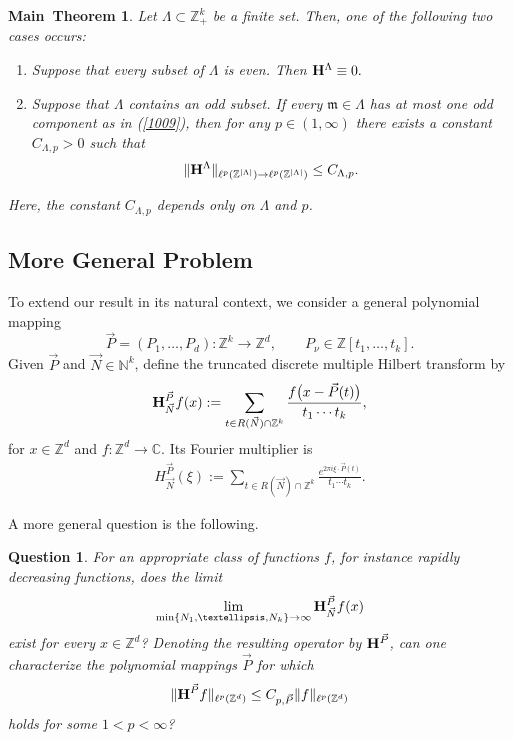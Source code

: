 \documentclass[10pt,a4paper]{amsart}
\newtheorem{main}{Main~Theorem}{}
\newtheorem{question}{Question}\numberwithin{question}{section}
\numberwithin{equation}{section}
\begin{document}
\begin{main}\label{mt2} 
Let $\Lambda \subset \mathbb{Z}_+^k$ be a finite set. Then, one of the following two cases occurs:
\begin{enumerate}
	\item[(i)] Suppose that every subset of $\Lambda$ is even. Then
	${\bf H}^{\Lambda} \equiv 0.$
	
	
	\item[(ii)] Suppose that $\Lambda$ contains an odd subset. 
	If every $\mathfrak{m} \in \Lambda$ has at most one odd component as in (\ref{1009}), then for any
	$p \in (1,\infty)$ there exists a constant $C_{\Lambda,p} > 0$ such that
	\[
	\| {\bf H}^{\Lambda} \|_{\ell^p(\mathbb{Z}^{|\Lambda|}) \to \ell^p(\mathbb{Z}^{|\Lambda|})}
	\le C_{\Lambda,p}.
	\]
\end{enumerate}
Here, the constant $C_{\Lambda,p}$ depends only on $\Lambda$ and $p$.
\end{main}






\subsection{More General Problem}
To extend our result in its natural context, we  consider a general polynomial mapping
\[
\vec P=(P_1,\ldots,P_d):\mathbb Z^k\to\mathbb Z^d,
\qquad
P_\nu\in\mathbb Z[t_1,\ldots,t_k].
\]
Given $\vec P$ and $\vec N\in\mathbb N^k$, define the truncated discrete
multiple Hilbert transform by
\begin{align}\label{mtp2}
	{\bf H}^{\vec P}_{\vec N}f(x)
	:=
	\sum_{t\in R(\vec N)\cap\mathbb Z^k}
	\frac{f\bigl(x-\vec P(t)\bigr)}{t_1\cdots t_k},
\end{align}for $x\in\mathbb Z^d$ and $f:\mathbb Z^d\to\mathbb C.$
Its Fourier multiplier is
\begin{align*}
	H^{\vec P}_{\vec N}(\xi)
	:=
	\sum_{t\in R(\vec N)\cap\mathbb Z^k}
	\frac{e^{2\pi i\xi\cdot\vec P(t)}}{t_1\cdots t_k}.
\end{align*}

A more general question is the following.

\medskip
\noindent
\begin{question}\label{q11}
	For an appropriate class of functions $f$, for instance rapidly decreasing
	functions, does the limit
	\[
	\lim_{\min\{N_1,\ldots,N_k\}\to\infty}
	{\bf H}^{\vec P}_{\vec N}f(x)
	\]
	exist for every $x\in\mathbb Z^d$? Denoting the resulting operator by
	${\bf H}^{\vec P}$, can one characterize the polynomial mappings $\vec P$
	for which
	\begin{align*}
		\|{\bf H}^{\vec P}f\|_{\ell^p(\mathbb Z^d)}
		\le
		C_{p,\vec P}\|f\|_{\ell^p(\mathbb Z^d)}
	\end{align*}
	holds for some $1<p<\infty$?
\end{question}
\end{document}
